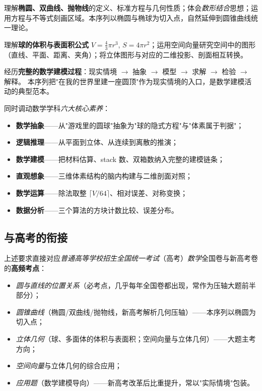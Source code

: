 \documentclass[12pt,a4paper]{scrartcl}
\newcommand{\acc}[1]{\textcolor{accent}{\textbf{#1}}}
\begin{document}
\begin{biaozhun}
理解\acc{椭圆、双曲线、抛物线}的定义、标准方程与几何性质；体会\emph{数形结合}思想；运用方程与不等式刻画区域。本序列以椭圆与椭球为切入点，自然延伸到圆锥曲线统一理论。
\end{biaozhun}

\begin{biaozhun}
理解\acc{球的体积与表面积公式} $V = \tfrac{4}{3}\pi r^3$, $S = 4\pi r^2$；运用空间向量研究空间中的图形（直线、平面、距离、夹角）；将立体图形与对应的二维投影、剖面相互转换。
\end{biaozhun}

\begin{biaozhun}
经历\acc{完整的数学建模过程}：现实情境 $\to$ 抽象 $\to$ 模型 $\to$ 求解 $\to$ 检验 $\to$ 解释。
本序列把"在我的世界里建一座圆顶"作为现实情境的入口，是数学建模活动的典型范本。
\end{biaozhun}

\medskip
同时调动数学学科\emph{六大核心素养}：

\begin{itemize}[leftmargin=1.3em,itemsep=0.15em,topsep=0.3em]
  \item \acc{数学抽象}——从"游戏里的圆球"抽象为"球的隐式方程"与"体素属于判据"；
  \item \acc{逻辑推理}——从平面到立体、从连续到离散的推演；
  \item \acc{数学建模}——把材料估算、stack 数、双箱数纳入完整的建模链条；
  \item \acc{直观想象}——三维体素结构的脑内构建与二维剖面对照；
  \item \acc{数学运算}——除法取整 $\lceil V/64 \rceil$、相对误差、对称变换；
  \item \acc{数据分析}——三个算法的方块计数比较、误差分布。
\end{itemize}

\subsection{与高考的衔接}\label{sec:enem}

上述要求直接对应\emph{普通高等学校招生全国统一考试}（高考）\emph{数学}全国卷与新高考卷的\acc{高频考点}：

\begin{itemize}[leftmargin=1.3em,itemsep=0.15em,topsep=0.3em]
  \item \emph{圆与直线的位置关系}（必考点，几乎每年全国卷都出现，常作为压轴大题前半部分）；
  \item \emph{圆锥曲线}（椭圆/双曲线/抛物线，新高考解析几何压轴）——本序列以椭圆为切入点；
  \item \emph{立体几何}（球、多面体的体积与表面积；空间向量与立体几何）——大题主考方向；
  \item \emph{空间向量}与立体几何的综合应用；
  \item \emph{应用题}（数学建模导向）——新高考改革后比重提升，常以"实际情境"包装。
\end{itemize}
\end{document}
